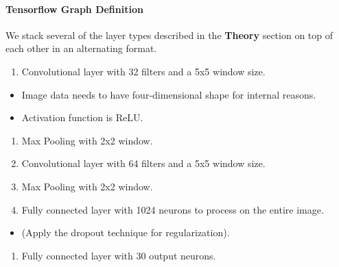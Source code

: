 \documentclass[]{article}
\providecommand{\tightlist}{%
  \setlength{\itemsep}{0pt}\setlength{\parskip}{0pt}}
\let\oldparagraph\paragraph
\renewcommand{\paragraph}[1]{\oldparagraph{#1}\mbox{}}
\begin{document}
\paragraph{Tensorflow Graph
Definition}\label{tensorflow-graph-definition}

We stack several of the layer types described in the \textbf{Theory}
section on top of each other in an alternating format.

\begin{enumerate}
\def\labelenumi{\arabic{enumi})}
\tightlist
\item
  Convolutional layer with 32 filters and a 5x5 window size.
\end{enumerate}

\begin{itemize}
\tightlist
\item
  Image data needs to have four-dimensional shape for internal reasons.
\item
  Activation function is ReLU.
\end{itemize}

\begin{enumerate}
\def\labelenumi{\arabic{enumi})}
\setcounter{enumi}{1}
\tightlist
\item
  Max Pooling with 2x2 window.
\item
  Convolutional layer with 64 filters and a 5x5 window size.
\item
  Max Pooling with 2x2 window.
\item
  Fully connected layer with 1024 neurons to process on the entire
  image.
\end{enumerate}

\begin{itemize}
\tightlist
\item
  (Apply the dropout technique for regularization).
\end{itemize}

\begin{enumerate}
\def\labelenumi{\arabic{enumi})}
\setcounter{enumi}{5}
\tightlist
\item
  Fully connected layer with 30 output neurons.
\end{enumerate}
\end{document}

